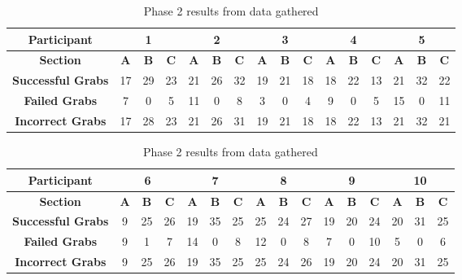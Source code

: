 \documentclass[12pt]{article}
\begin{document}
\begin{table}[!ht]
\centering
\begin{tabular}{ |c|c|c|c|c|c|c|c|c|c|c|c|c|c|c|c| }
 	\hline
	\textbf{Participant} & \multicolumn{3}{|c|}{\textbf{1}} &  \multicolumn{3}{|c|}{\textbf{2}} & \multicolumn{3}{|c|}{\textbf{3}} & \multicolumn{3}{|c|}{\textbf{4}} & \multicolumn{3}{|c|}{\textbf{5}} \\
	\hline
	\textbf{Section} & \textbf{A} & \textbf{B} & \textbf{C} & \textbf{A} & \textbf{B} & \textbf{C} & \textbf{A} & \textbf{B} & \textbf{C} & \textbf{A} & \textbf{B} & \textbf{C} & \textbf{A} & \textbf{B} & \textbf{C} \\
	\hline
	\textbf{Successful Grabs} & 17 & 29 & 23 & 21 & 26 & 32 & 19 & 21 & 18 & 18 & 22 & 13 & 21 & 32 & 22 \\
	\hline
	\textbf{Failed Grabs} & 7 & 0 & 5 & 11 & 0 & 8 & 3 & 0 & 4 & 9 & 0 & 5 & 15 & 0 & 11 \\
	\hline
	\textbf{Incorrect Grabs} & 17 & 28 & 23 & 21 & 26 & 31 & 19 & 21 & 18 & 18 & 22 & 13 & 21 & 32 & 21 \\
	\hline
\end{tabular}

\centering
\vspace{1cm}\begin{tabular}{ |c|c|c|c|c|c|c|c|c|c|c|c|c|c|c|c| }
 	\hline
	\textbf{Participant} & \multicolumn{3}{|c|}{\textbf{6}} & \multicolumn{3}{|c|}{\textbf{7}} & \multicolumn{3}{|c|}{\textbf{8}} & \multicolumn{3}{|c|}{\textbf{9}} & \multicolumn{3}{|c|}{\textbf{10}} \\
	\hline
	\textbf{Section} & \textbf{A} & \textbf{B} & \textbf{C} & \textbf{A} & \textbf{B} & \textbf{C} & \textbf{A} & \textbf{B} & \textbf{C} & \textbf{A} & \textbf{B} & \textbf{C} & \textbf{A} & \textbf{B} & \textbf{C} \\
	\hline
	\textbf{Successful Grabs} & 9 & 25 & 26 & 19 & 35 & 25 & 25 & 24 & 27 & 19 & 20 & 24 & 20 & 31 & 25 \\
	\hline
	\textbf{Failed Grabs} & 9 & 1 & 7 & 14 & 0 & 8 & 12 & 0 & 8 & 7 & 0 & 10 & 5 & 0 & 6 \\
	\hline
	\textbf{Incorrect Grabs} & 9 & 25 & 26 & 19 & 35 & 25 & 25 & 24 & 26 & 19 & 20 & 24 & 20 & 31 & 25 \\
	\hline
\end{tabular}

\caption{Phase 2 results from data gathered}
\end{table} 

\pagebreak
\end{document}
